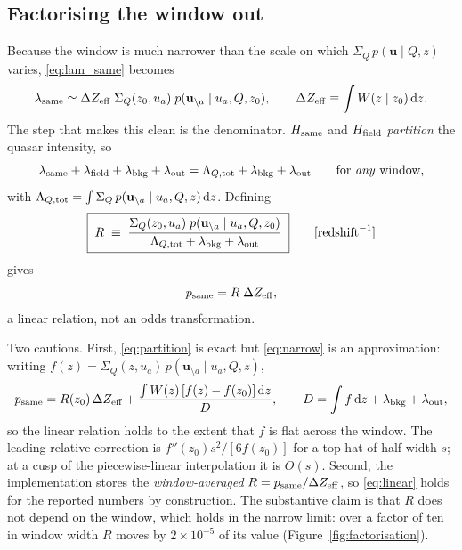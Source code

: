 \documentclass[11pt,a4paper]{article}
\newcommand{\uvec}{\mathbf{u}}
\newcommand{\Sq}{\Sigma_{Q}}
\newcommand{\dd}{\mathrm{d}}
\newcommand{\Hsame}{H_{\rm same}}
\newcommand{\Hfield}{H_{\rm field}}
\begin{document}
\subsection{Factorising the window out}

Because the window is much narrower than the scale on which
$\Sq\,p(\uvec\mid Q,z)$ varies, \eqref{eq:lam_same} becomes
%
\begin{equation}
\lambda_{\rm same} \simeq
\Delta Z_{\rm eff}\;\Sq(z_0,u_a)\;p(\uvec_{\setminus a}\mid u_a,Q,z_0),
\qquad
\Delta Z_{\rm eff} \equiv \int W(z\mid z_0)\,\dd z .
\label{eq:narrow}
\end{equation}
%
The step that makes this clean is the denominator. $\Hsame$ and $\Hfield$
\emph{partition} the quasar intensity, so
%
\begin{equation}
\lambda_{\rm same}+\lambda_{\rm field}+\lambda_{\rm bkg}+\lambda_{\rm out}
= \Lambda_{Q,{\rm tot}} + \lambda_{\rm bkg}+\lambda_{\rm out}
\qquad\text{for \emph{any} window,}
\label{eq:partition}
\end{equation}
%
with $\Lambda_{Q,{\rm tot}}=\int\Sq\,p(\uvec_{\setminus a}\mid u_a,Q,z)\,\dd z$.
Defining
%
\begin{equation}
\boxed{\;
R \;\equiv\;
\frac{\Sq(z_0,u_a)\;p(\uvec_{\setminus a}\mid u_a,Q,z_0)}
     {\Lambda_{Q,{\rm tot}} + \lambda_{\rm bkg}+\lambda_{\rm out}}
\;}
\qquad [\text{redshift}^{-1}]
\label{eq:R}
\end{equation}
%
gives
%
\begin{equation}
p_{\rm same} = R\;\Delta Z_{\rm eff},
\label{eq:linear}
\end{equation}
%
a linear relation, not an odds transformation.

Two cautions. First, \eqref{eq:partition} is exact but \eqref{eq:narrow} is an
approximation: writing $f(z)=\Sq(z,u_a)\,p(\uvec_{\setminus a}\mid u_a,Q,z)$,
%
\begin{equation}
p_{\rm same}
= R(z_0)\,\Delta Z_{\rm eff}
+ \frac{\int W(z)\,[f(z)-f(z_0)]\,\dd z}{D},
\qquad D = \int f\,\dd z + \lambda_{\rm bkg}+\lambda_{\rm out},
\end{equation}
%
so the linear relation holds to the extent that $f$ is flat across the window.
The leading relative correction is $f''(z_0)s^2/[6f(z_0)]$ for a top hat of
half-width $s$; at a cusp of the piecewise-linear interpolation it is $O(s)$.
Second, the implementation stores the \emph{window-averaged} $R =
p_{\rm same}/\Delta Z_{\rm eff}$, so \eqref{eq:linear} holds for the reported
numbers by construction. The substantive claim is that $R$ does not depend on
the window, which holds in the narrow limit: over a factor of ten in window
width $R$ moves by $2\times10^{-5}$ of its value (Figure~\ref{fig:factorisation}).
\end{document}
